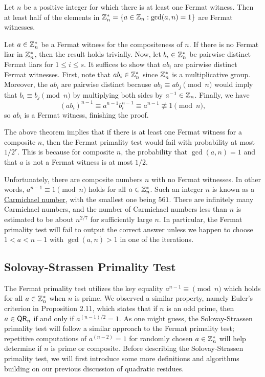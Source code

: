 \begin{thm}
Let $n$ be a positive integer for which there is at least one Fermat witness. Then at least 
half of the elements in $\mathbb{Z}_n^* = \{a \in \mathbb{Z}_n : \gcd(a, n) = 1\}$ are Fermat witnesses. 
\end{thm}
\begin{pf}
Let $a \in \mathbb{Z}_n^*$ be a Fermat witness for the compositeness of $n$. If there is no Fermat liar in 
$\mathbb{Z}_n^*$, then the result holds trivially. Now, let $b_i \in \mathbb{Z}_n^*$ be pairwise distinct 
Fermat liars for $1 \leq i \leq s$. It suffices to show that $ab_i$ are pairwise distinct 
Fermat witnesses. First, note that $ab_i \in \mathbb{Z}_n^*$ since $\mathbb{Z}_n^*$ is a multiplicative group. 
Moreover, the $ab_i$ are pairwise distinct because $ab_i \equiv ab_j \pmod n$ would imply that 
$b_i \equiv b_j \pmod n$ by multiplying both sides by $a^{-1} \in \mathbb{Z}_n$. Finally, we have 
\[ (ab_i)^{n-1} \equiv a^{n-1} b_i^{n-1} \equiv a^{n-1} \not\equiv 1 \pmod n, \]
so $ab_i$ is a Fermat witness, finishing the proof. 
\end{pf}

The above theorem implies that if there is at least one Fermat witness for a composite $n$, then 
the Fermat primality test would fail with probability at most $1/2^r$. This is because for 
composite $n$, the probability that $\gcd(a, n) = 1$ and that $a$ is not a Fermat witness is at 
most $1/2$. 

Unfortunately, there are composite numbers $n$ with no Fermat witnesses. 
In other words, $a^{n-1} \equiv 1 \pmod n$ holds for all $a \in \mathbb{Z}_n^*$. Such an integer $n$ 
is known as a \href{https://en.wikipedia.org/wiki/Carmichael_number}{Carmichael number}, with the smallest one being $561$. There are 
infinitely many Carmichael numbers, and the number of Carmichael numbers less than $n$ is 
estimated to be about $n^{2/7}$ for sufficiently large $n$. In particular, the Fermat primality 
test will fail to output the correct answer unless we happen to choose $1 < a < n-1$ with 
$\gcd(a, n) > 1$ in one of the iterations. 

\subsection{Solovay-Strassen Primality Test}
The Fermat primality test utilizes the key equality $a^{n-1} \equiv \pmod n$ which holds for all $a \in 
\mathbb{Z}_n^*$ when $n$ is prime. We observed a similar property, namely Euler's criterion in Proposition 2.11,
which states that if $n$ is an odd prime, then $a \in {\sf QR}_n$ if and only if $a^{(n-1)/2} = 1$. 
As one might guess, the Solovay-Strassen primality test will follow a similar approach to the 
Fermat primality test; repetitive computations of $a^{(n-2)} = 1$ for randomly chosen 
$a \in \mathbb{Z}_n^*$ will help determine if $n$ is prime or composite. Before describing the 
Solovay-Strassen primality test, we will first introduce some more definitions and algorithms 
building on our previous discussion of quadratic residues. 

